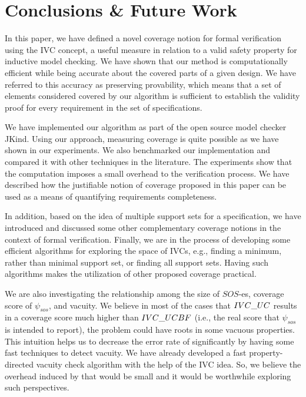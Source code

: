 \section{Conclusions \& Future Work}
\label{sec:conclusion}

In this paper, we have defined a novel coverage notion for formal verification using
the IVC concept, a useful measure in relation to
a valid safety property for inductive model checking. We have shown that our method
 is computationally efficient while
 being accurate about the covered parts of a given design.
 We have referred to this accuracy as preserving provability, which means
 that a set of elements considered covered by our algorithm is sufficient
 to establish the validity proof for every requirement in the set of specifications.

 We have implemented
our algorithm as part of the open source model checker JKind. Using our approach, measuring coverage is quite possible as we have shown in our experiments.
 We also benchmarked our implementation and compared it with other techniques in the literature.
 The experiments show that the computation imposes a small overhead to the verification process. We have described how the justifiable notion of coverage proposed in this paper can be used as a
means of quantifying requirements completeness.

 In addition, based on the idea of multiple support sets for a specification, we
 have introduced and discussed some other complementary coverage notions in the context of formal verification. Finally, we are in the process of developing some efficient algorithms for exploring the space of IVCs, e.g., finding a
minimum, rather than minimal support set, or finding all support sets. Having such algorithms makes the utilization of other proposed coverage practical. 

We are also investigating the relationship among the size of $SOS$-es, coverage score of $\psi_{sos}$, and vacuity. We believe in most of the cases that ${IVC\_UC}$ results in a coverage score much higher
than ${IVC\_UCBF}$ (i.e., the real score that $\psi_{sos}$ is intended to report), the problem 
could have roots in some vacuous properties. This intuition helps us to decrease the error rate of \ucalg significantly by having some fast techniques to detect vacuity. We have already developed a  fast property-directed vacuity check
algorithm with the help of the IVC idea. So, we believe the overhead induced by that would be small and it would be worthwhile exploring such perspectives. 